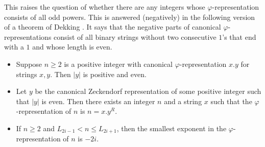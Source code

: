 \documentclass[12pt,reqno]{article}
\begin{document}
This raises the question of whether there are any integers whose $\varphi$-representation consists of all odd powers.  This is answered (negatively) in the following version of a theorem of Dekking \cite[Thm.~9]{Dekking:2024}.  It says that the negative parts of canonical $\varphi$-representations consist of all binary strings without two consecutive $1$'s that end with a $1$ and whose length is even.
\bigbreak
\begin{theorem}\label{thm:last_index}
\leavevmode
\begin{itemize}
    \item[(a)] 
Suppose $n \geq 2$ is a positive integer with canonical 
$\varphi$-representation $x.y$ for strings $x,y$.
Then $|y|$ is positive and even.

    \item[(b)]  Let $y$ be the canonical Zeckendorf representation of some positive integer such that $|y|$ is even.  Then there exists an integer
    $n$ and a string $x$ such that the $\varphi$-representation of $n$ is $n = x.y^R$.
    
\item[(c)] 
If $n \geq 2$ and $L_{2i-1} < n \leq L_{2i+1}$, then the smallest exponent in the $\varphi$-representation of $n$ 
is $-2i$.
\end{itemize}
\end{theorem}
\end{document}
